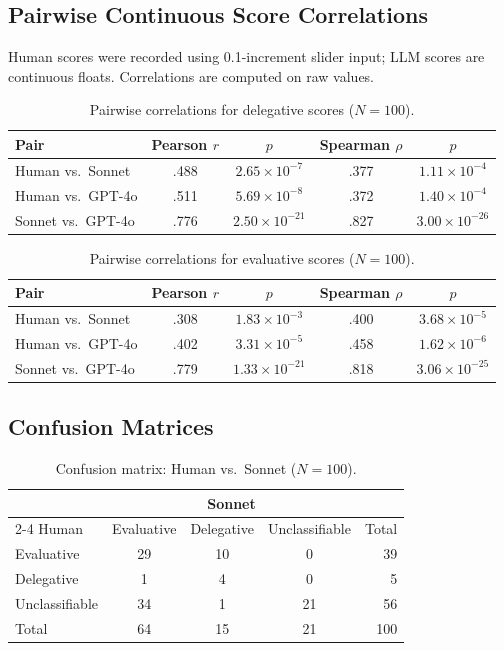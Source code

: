 \subsection{Pairwise Continuous Score Correlations}

Human scores were recorded using 0.1-increment slider input; LLM scores are continuous floats. Correlations are computed on raw values.

\begin{table}[H]
\centering
\caption{Pairwise correlations for delegative scores ($N = 100$).}
\label{tab:deleg_corr}
\begin{tabular}{lcccc}
\toprule
Pair & Pearson $r$ & $p$ & Spearman $\rho$ & $p$ \\
\midrule
Human vs.\ Sonnet  & .488 & $2.65 \times 10^{-7}$  & .377 & $1.11 \times 10^{-4}$ \\
Human vs.\ GPT-4o  & .511 & $5.69 \times 10^{-8}$  & .372 & $1.40 \times 10^{-4}$ \\
Sonnet vs.\ GPT-4o & .776 & $2.50 \times 10^{-21}$ & .827 & $3.00 \times 10^{-26}$ \\
\bottomrule
\end{tabular}
\end{table}

\begin{table}[H]
\centering
\caption{Pairwise correlations for evaluative scores ($N = 100$).}
\label{tab:eval_corr}
\begin{tabular}{lcccc}
\toprule
Pair & Pearson $r$ & $p$ & Spearman $\rho$ & $p$ \\
\midrule
Human vs.\ Sonnet  & .308 & $1.83 \times 10^{-3}$  & .400 & $3.68 \times 10^{-5}$ \\
Human vs.\ GPT-4o  & .402 & $3.31 \times 10^{-5}$  & .458 & $1.62 \times 10^{-6}$ \\
Sonnet vs.\ GPT-4o & .779 & $1.33 \times 10^{-21}$ & .818 & $3.06 \times 10^{-25}$ \\
\bottomrule
\end{tabular}
\end{table}

\subsection{Confusion Matrices}

\begin{table}[H]
\centering
\caption{Confusion matrix: Human vs.\ Sonnet ($N = 100$).}
\label{tab:cm_human_sonnet}
\begin{tabular}{lcccr}
\toprule
 & \multicolumn{3}{c}{Sonnet} & \\
\cmidrule(lr){2-4}
Human & Evaluative & Delegative & Unclassifiable & Total \\
\midrule
Evaluative      & 29 & 10 &  0 &  39 \\
Delegative      &  1 &  4 &  0 &   5 \\
Unclassifiable  & 34 &  1 & 21 &  56 \\
\midrule
Total           & 64 & 15 & 21 & 100 \\
\bottomrule
\end{tabular}
\end{table}

